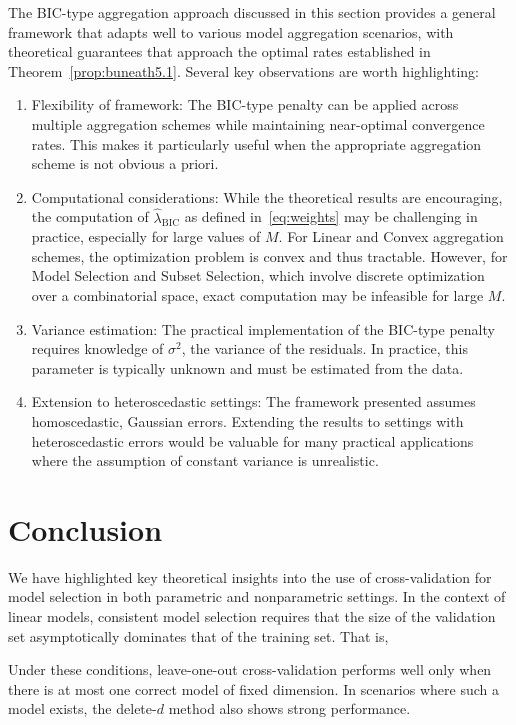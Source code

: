 \documentclass[11pt, letter paper]{article}
\newcommand{\1}{\mathmybb{1}}
\newcommand{\0}{\emptyset}
\newcommand{\lambdahat}[1]{\hat{\lambda}_{#1}}
\begin{document}
The BIC-type aggregation approach discussed in this section provides a general framework that adapts well to various model aggregation scenarios, with theoretical guarantees that approach the optimal rates established in Theorem~\ref{prop:buneath5.1}. Several key observations are worth highlighting:
\begin{enumerate}
    \item Flexibility of framework: The BIC-type penalty can be applied across multiple aggregation schemes while maintaining near-optimal convergence rates. This makes it particularly useful when the appropriate aggregation scheme is not obvious a priori.
    \item Computational considerations: While the theoretical results are encouraging, the computation of $\lambdahat{\text{BIC}}$ as defined in~\eqref{eq:weights} may be challenging in practice, especially for large values of $M$. For Linear and Convex aggregation schemes, the optimization problem is convex and thus tractable. However, for Model Selection and Subset Selection, which involve discrete optimization over a combinatorial space, exact computation may be infeasible for large $M$.
    \item Variance estimation: The practical implementation of the BIC-type penalty requires knowledge of $\sigma^2$, the variance of the residuals. In practice, this parameter is typically unknown and must be estimated from the data.
    \item Extension to heteroscedastic settings: The framework presented assumes homoscedastic, Gaussian errors. Extending the results to settings with heteroscedastic errors would be valuable for many practical applications where the assumption of constant variance is unrealistic.
\end{enumerate}


\section{Conclusion}

We have highlighted key theoretical insights into the use of cross-validation for model selection in both parametric and nonparametric settings. In the context of linear models, consistent model selection requires that the size of the validation set asymptotically dominates that of the training set. That is,

Under these conditions, leave-one-out cross-validation performs well only when there is at most one correct model of fixed dimension. In scenarios where such a model exists, the delete-\(d\) method also shows strong performance.
\end{document}
